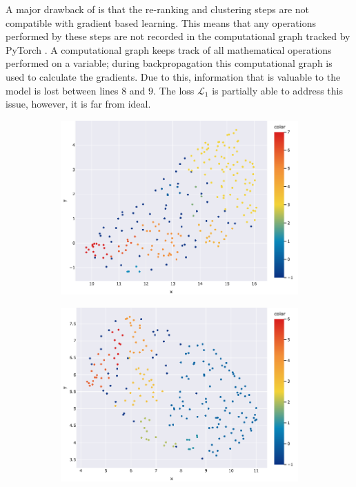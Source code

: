 A major drawback of \ccclr{} is that the re-ranking and clustering steps are not compatible with gradient based learning. This means that any operations performed by these steps are not recorded in the computational graph tracked by PyTorch \parencite{pytorch2019}. A computational graph keeps track of all mathematical operations performed on a variable; during backpropagation this computational graph is used to calculate the gradients.
Due to this, information that is valuable to the model is lost between lines $8$ and $9$. The loss $\mathcal{L}_1$ is partially able to address this issue, however, it is far from ideal.

\begin{figure}[th]
     \centering
     \begin{subfigure}[b]{0.45\textwidth}
         \centering
         \includegraphics[width=\textwidth]{chapters/assets/c3lr_extra/c1.png}
     \end{subfigure}
     \hspace{1cm}
     \begin{subfigure}[b]{0.45\textwidth}
         \centering
         \includegraphics[width=\textwidth]{chapters/assets/c3lr_extra/c2.png}

\end{subfigure}
\end{figure}
